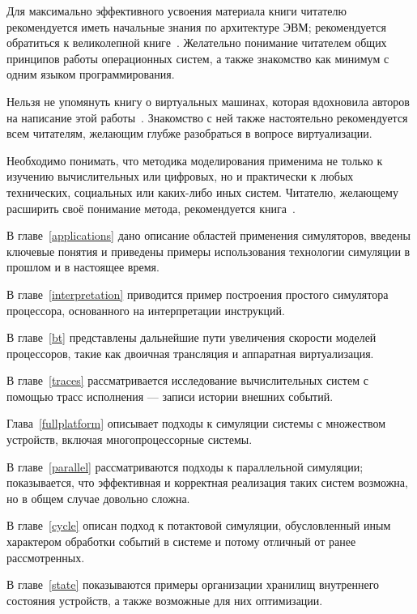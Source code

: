 Для максимально эффективного усвоения материала книги читателю рекомендуется иметь начальные знания по архитектуре ЭВМ; рекомендуется обратиться к великолепной книге~\cite{patterson2012rus}. Желательно понимание читателем общих принципов работы операционных систем, а также знакомство как  минимум с одним языком программирования.

Нельзя не упомянуть книгу о виртуальных машинах, которая вдохновила авторов на написание этой работы~\cite{DBLP:books/daglib/0013597}. Знакомство с ней также настоятельно рекомендуется всем читателям, желающим глубже разобраться в вопросе виртуализации.

Необходимо понимать, что методика моделирования применима не только к изучению вычислительных или цифровых, но и практически к любых технических, социальных или каких-либо иных систем. Читателю, желающему расширить своё понимание метода, рекомендуется книга~\cite{system-modeling}.

В главе~\ref{applications} дано описание областей применения симуляторов, введены ключевые понятия и приведены примеры использования технологии симуляции в прошлом и в настоящее время.

В главе~\ref{interpretation} приводится пример построения простого симулятора процессора, основанного на интерпретации инструкций.

В главе~\ref{bt} представлены дальнейшие пути увеличения скорости моделей процессоров, такие как двоичная трансляция и аппаратная виртуализация.

В главе~\ref{traces} рассматривается исследование вычислительных систем с помощью трасс исполнения --- записи истории внешних событий.


Глава~\ref{fullplatform} описывает подходы к симуляции системы с множеством устройств, включая многопроцессорные системы.

В главе~\ref{parallel} рассматриваются подходы к параллельной симуляции; показывается, что эффективная и корректная реализация таких систем возможна, но в общем случае довольно сложна.

В главе~\ref{cycle} описан подход к потактовой симуляции, обусловленный иным характером обработки событий в системе и потому отличный от ранее рассмотренных.

В главе~\ref{state} показываются примеры организации хранилищ внутреннего состояния устройств, а также возможные для них оптимизации.

